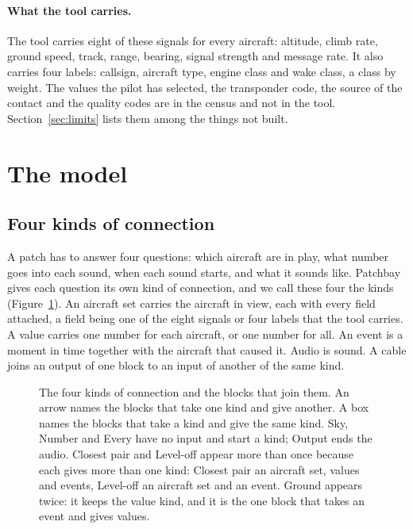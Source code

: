 \documentclass[11pt,letterpaper]{article}
\begin{document}
\paragraph{What the tool carries.} The tool carries eight of these signals for every aircraft: altitude, climb rate, ground speed, track, range, bearing, signal strength and message rate. It also carries four labels: callsign, aircraft type, engine class and wake class, a class by weight. The values the pilot has selected, the transponder code, the source of the contact and the quality codes are in the census and not in the tool. Section~\ref{sec:limits} lists them among the things not built.

\section{The model}\label{sec:model}

\subsection{Four kinds of connection}

A patch has to answer four questions: which aircraft are in play, what number goes into each sound, when each sound starts, and what it sounds like. Patchbay gives each question its own kind of connection, and we call these four the kinds (Figure~\ref{fig:kinds}). An aircraft set carries the aircraft in view, each with every field attached, a field being one of the eight signals or four labels that the tool carries. A value carries one number for each aircraft, or one number for all. An event is a moment in time together with the aircraft that caused it. Audio is sound. A cable joins an output of one block to an input of another of the same kind.

\begin{figure}[t]
\centering
\resizebox{\linewidth}{!}{}
\caption{The four kinds of connection and the blocks that join them. An arrow names the blocks that take one kind and give another. A box names the blocks that take a kind and give the same kind. Sky, Number and Every have no input and start a kind; Output ends the audio. Closest pair and Level-off appear more than once because each gives more than one kind: Closest pair an aircraft set, values and events, Level-off an aircraft set and an event. Ground appears twice: it keeps the value kind, and it is the one block that takes an event and gives values.}
\label{fig:kinds}
\end{figure}
\end{document}

